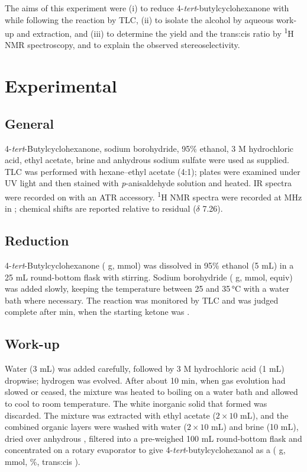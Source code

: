 \documentclass[11pt,a4paper]{article}
\begin{document}
The aims of this experiment were (i) to reduce 4-\emph{tert}-butylcyclohexanone with  while following the reaction by TLC, (ii) to isolate the alcohol by aqueous work-up and extraction, and (iii) to determine the yield and the trans:cis ratio by \textsuperscript{1}H NMR spectroscopy, and to explain the observed stereoselectivity.

\section{Experimental}

\subsection{General}
4-\emph{tert}-Butylcyclohexanone, sodium borohydride, 95\% ethanol, 3 M hydrochloric acid, ethyl acetate, brine and anhydrous sodium sulfate were used as supplied. TLC was performed with hexane--ethyl acetate (4:1); plates were examined under UV light and then stained with \emph{p}-anisaldehyde solution and heated. IR spectra were recorded on  with an ATR accessory. \textsuperscript{1}H NMR spectra were recorded at  MHz in ; chemical shifts are reported relative to residual  ($\delta$ 7.26).\cite{Fulmer2010}

\subsection{Reduction}
4-\emph{tert}-Butylcyclohexanone ( g,  mmol) was dissolved in 95\% ethanol (5 mL) in a 25 mL round-bottom flask with stirring. Sodium borohydride ( g,  mmol,  equiv) was added slowly, keeping the temperature between 25 and 35\,\si{\celsius} with a water bath where necessary.  The reaction was monitored by TLC and was judged complete after  min, when the starting ketone was .

\subsection{Work-up}
Water (3 mL) was added carefully, followed by 3 M hydrochloric acid (1 mL) dropwise; hydrogen was evolved. After about 10 min, when gas evolution had slowed or ceased, the mixture was heated to boiling on a water bath and allowed to cool to room temperature. The white inorganic solid that formed was discarded. The mixture was extracted with ethyl acetate ($2\times10$ mL), and the combined organic layers were washed with water ($2\times10$ mL) and brine (10 mL), dried over anhydrous , filtered into a pre-weighed 100 mL round-bottom flask and concentrated on a rotary evaporator to give 4-\emph{tert}-butylcyclohexanol as a  ( g,  mmol, \%, trans:cis ).
\end{document}
